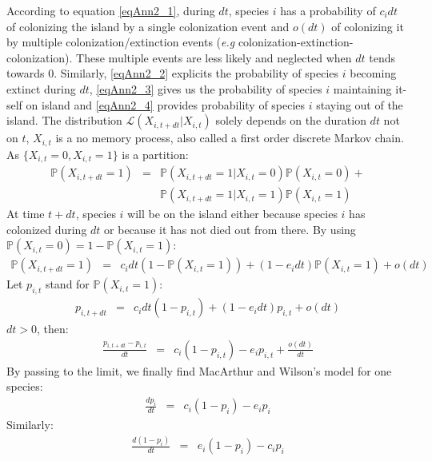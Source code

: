 According to equation \eqref{eqAnn2_1}, during $dt$, species $i$ has a probability of $c_idt$ of colonizing the island by a single colonization event and $o(dt)$ of colonizing it by multiple colonization/extinction events (\emph{e.g} colonization-extinction-colonization). These multiple events are less likely and neglected when $dt$ tends towards $0$. Similarly, \eqref{eqAnn2_2} explicits the probability of species $i$ becoming extinct during $dt$, \eqref{eqAnn2_3} gives us the probability of species $i$ maintaining it-self on island and \eqref{eqAnn2_4} provides probability of species $i$ staying out of the island. The distribution $\mathcal{L}(X_{i,t+dt}|X_{i,t})$
solely depends on the duration $dt$ not on $t$, $X_{i,t}$ is a no memory process, also called a first order discrete Markov chain. As $\{X_{i,t}=0, X_{i,t}=1\}$ is a partition:
\begin{eqnarray}
\nonumber  \mathbb{P}(X_{i,t+dt}=1)&=& \mathbb{P}(X_{i,t+dt}=1|X_{i,t}=0) \mathbb{P}(X_{i,t}=0) + \\
\label{eqAnn2_6}              & & \mathbb{P}(X_{i,t+dt}=1|X_{i,t}=1) \mathbb{P}(X_{i,t}=1)
\end{eqnarray}
At time $t+dt$, species $i$ will be on the island either because species $i$ has colonized during $dt$ or because it has not died out from there. By using $ \mathbb{P}(X_{i,t}=0)=1- \mathbb{P}(X_{i,t}=1)$:
\begin{eqnarray}
\label{eqAnn2_7}  \mathbb{P}(X_{i,t+dt}=1)&=&c_idt(1- \mathbb{P}(X_{i,t}=1))+(1-e_idt) \mathbb{P}(X_{i,t}=1)+o(dt)
\end{eqnarray}
Let $p_{i,t}$ stand for $ \mathbb{P}(X_{i,t}=1)$:
\begin{eqnarray}
\label{eqAnn2_8} p_{i,t+dt}&=&c_idt(1-p_{i,t})+(1-e_idt)p_{i,t}+o(dt)
\end{eqnarray}
$dt>0$, then:
\begin{eqnarray}
\label{eqAnn2_8} \frac{p_{i,t+dt}-p_{i,t}}{dt}&=&c_i(1-p_{i,t})-e_ip_{i,t}+\frac{o(dt)}{dt}
\end{eqnarray}
By passing to the limit, we finally find MacArthur and Wilson's model for one species:
\begin{eqnarray}
\label{eqAnn2_9} \frac{dp_{i}}{dt}&=&c_i(1-p_{i})-e_ip_{i}
\end{eqnarray}
Similarly:
\begin{eqnarray}
\label{eqAnn2_10} \frac{d(1-p_{i})}{dt}&=&e_i(1-p_{i})-c_ip_{i}
\end{eqnarray}

